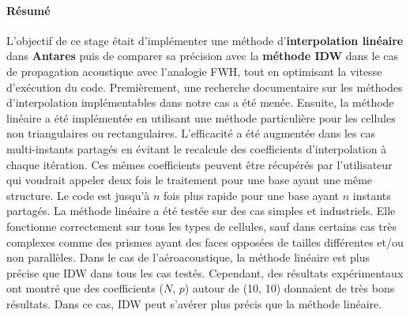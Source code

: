 \cleardoublepage
\paragraph{Résumé}
\vspace{0,5cm}
L'objectif de ce stage était d'implémenter une méthode d'\textbf{interpolation linéaire} dans \textbf{Antares} puis de comparer sa précision avec la \textbf{méthode IDW} dans le cas de propagation acoustique avec l'analogie FWH, tout en optimisant la vitesse d'exécution du code.
Premièrement, une recherche documentaire sur les méthodes d'interpolation implémentables dans notre cas a été menée.
Ensuite, la méthode linéaire a été implémentée en utilisant une méthode particulière pour les cellules non triangulaires ou rectangulaires.
L'efficacité a été augmentée dans les cas multi-instants partagés en évitant le recalcule des coefficients d'interpolation à chaque itération. Ces mêmes coefficients peuvent être récupérés par l'utilisateur qui voudrait appeler deux fois le traitement pour une base ayant une même structure.
Le code est jusqu'à \(n\) fois plus rapide pour une base ayant \(n\) instants partagés.
La méthode linéaire a été testée sur des cas simples et industriels. Elle fonctionne correctement sur tous les types de cellules, sauf dans certains cas très complexes comme des prismes ayant des faces opposées de tailles différentes et/ou non parallèles.
Dans le cas de l'aéroacoustique, la méthode linéaire est plus précise que IDW dans tous les cas testés. Cependant, des résultats expérimentaux ont montré que des coefficients (\(N\), \(p\)) autour de (10, 10) donnaient de très bons résultats. Dans ce cas, IDW peut s'avérer plus précis que la méthode linéaire.

